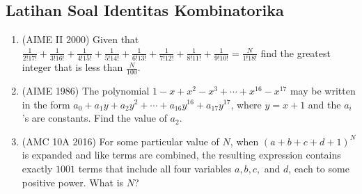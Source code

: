 \subsection{Latihan Soal Identitas Kombinatorika}
\begin{enumerate}
    \item (AIME II 2000) Given that
            $\frac 1{2!17!}+\frac 1{3!16!}+\frac 1{4!15!}+\frac 1{5!14!}+\frac 1{6!13!}+\frac 1{7!12!}+\frac 1{8!11!}+\frac 1{9!10!}=\frac N{1!18!}$
            find the greatest integer that is less than $\frac N{100}$. 

        \item (AIME 1986) The polynomial $1-x+x^2-x^3+\cdots+x^{16}-x^{17}$ may be written in the form $a_0+a_1y+a_2y^2+\cdots +a_{16}y^{16}+a_{17}y^{17}$, where $y=x+1$ and the $a_i$'s are constants. Find the value of $a_2$.

        \item (AMC 10A 2016) For some particular value of $N$, when $(a+b+c+d+1)^N$ is expanded and like terms are combined, the resulting expression contains exactly $1001$ terms that include all four variables $a, b,c,$ and $d$, each to some positive power. What is $N$?
\end{enumerate}